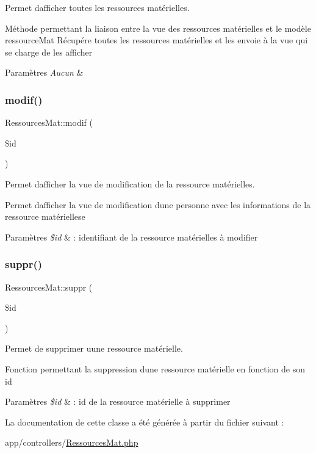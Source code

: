Permet d\textquotesingle{}afficher toutes les ressources matérielles. 

Méthode permettant la liaison entre la vue des ressources matérielles et le modèle ressource\+Mat Récupére toutes les ressources matérielles et les envoie à la vue qui se charge de les afficher 
\begin{DoxyParams}{Paramètres}
{\em Aucun} & \\
\hline
\end{DoxyParams}
\mbox{\label{class_ressources_mat_afbe710775eca4dfbd9f67a51d3777888}} 
\subsubsection{\texorpdfstring{modif()}{modif()}}
{\footnotesize\ttfamily Ressources\+Mat\+::modif (\begin{DoxyParamCaption}\item[{}]{\$id }\end{DoxyParamCaption})}



Permet d\textquotesingle{}afficher la vue de modification de la ressource matérielles. 

Permet d\textquotesingle{}afficher la vue de modification d\textquotesingle{}une personne avec les informations de la ressource matériellese 
\begin{DoxyParams}{Paramètres}
{\em \$id} & \+: identifiant de la ressource matérielles à modifier \\
\hline
\end{DoxyParams}
\mbox{\label{class_ressources_mat_a61c24d6e53f6a5d69470c4a88da3e24a}} 
\subsubsection{\texorpdfstring{suppr()}{suppr()}}
{\footnotesize\ttfamily Ressources\+Mat\+::suppr (\begin{DoxyParamCaption}\item[{}]{\$id }\end{DoxyParamCaption})}



Permet de supprimer uune ressource matérielle. 

Fonction permettant la suppression d\textquotesingle{}une ressource matérielle en fonction de son id 
\begin{DoxyParams}{Paramètres}
{\em \$id} & \+: id de la ressource matérielle à supprimer \\
\hline
\end{DoxyParams}


La documentation de cette classe a été générée à partir du fichier suivant \+:\begin{DoxyCompactItemize}
\item 
app/controllers/\hyperlink{_ressources_mat_8php}{Ressources\+Mat.\+php}\end{DoxyCompactItemize}
